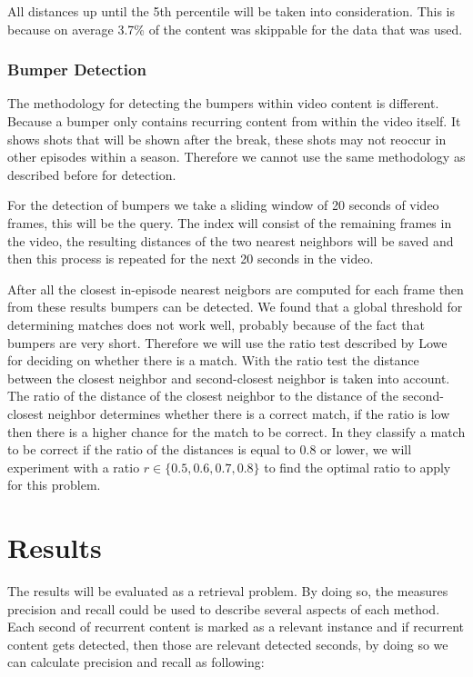\documentclass{article}
\begin{document}
All distances up until the 5th percentile will be taken into consideration. This is because on average 3.7\% of the content was skippable for the data that was used.

\subsubsection{Bumper Detection}
The methodology for detecting the bumpers within video content is different. Because a bumper only contains recurring content from within the video itself. It shows shots that will be shown after the break, these shots may not reoccur in other episodes within a season. Therefore we cannot use the same methodology as described before for detection.

For the detection of bumpers we take a sliding window of 20 seconds of video frames, this will be the query. The index will consist of the remaining frames in the video, the resulting distances of the two nearest neighbors will be saved and then this process is repeated for the next 20 seconds in the video.

After all the closest in-episode nearest neigbors are computed for each frame then from these results bumpers can be detected. We found that a global threshold for determining matches does not work well, probably because of the fact that bumpers are very short. Therefore we will use the ratio test described by Lowe \cite{lowe2004distinctive} for deciding on whether there is a match. With the ratio test the distance between the closest neighbor and second-closest neighbor is taken into account. The ratio of the distance of the closest neighbor to the distance of the second-closest neighbor determines whether there is a correct match, if the ratio is low then there is a higher chance for the match to be correct. In \cite{lowe2004distinctive} they classify a match to be correct if the ratio of the distances is equal to 0.8 or lower, we will experiment with a ratio $r \in \{0.5, 0.6, 0.7, 0.8\}$ to find the optimal ratio to apply for this problem.



\section{Results} \label{results}

The results will be evaluated as a retrieval problem. By doing so, the measures precision and recall could be used to describe several aspects of each method. Each second of recurrent content is marked as a relevant instance and if recurrent content gets detected, then those are relevant detected seconds, by doing so we can calculate precision and recall as following:
\end{document}
